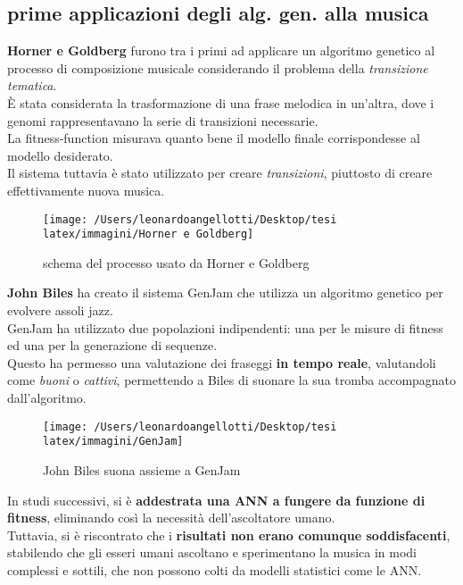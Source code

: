 \documentclass[a4paper,12pt]{report}
\begin{document}
\subsection{prime applicazioni degli alg. gen. alla musica}

\textbf{Horner e Goldberg} furono tra i primi ad applicare un algoritmo genetico al processo di composizione musicale considerando il problema della \textit{transizione tematica}. \\
È stata considerata la trasformazione di una frase melodica in un'altra, dove i genomi rappresentavano la serie di transizioni necessarie.  \\
La fitness-function misurava quanto bene il modello finale corrispondesse al modello desiderato. \\
Il sistema tuttavia è stato utilizzato per creare \textit{transizioni}, piuttosto di creare effettivamente nuova musica. 

\begin{figure}[H]
    \centering
    \texttt{[image: /Users/leonardoangellotti/Desktop/tesi latex/immagini/Horner e Goldberg]} 
    \caption{schema del processo usato da Horner e Goldberg}
    \label{fig:immagine17}
\end{figure}

\textbf{John Biles} ha creato il sistema GenJam che utilizza un algoritmo genetico per evolvere assoli jazz. \\
GenJam ha utilizzato due popolazioni indipendenti: una per le misure di fitness ed una per la generazione di sequenze. \\
Questo ha permesso una valutazione dei fraseggi \textbf{in tempo reale}, valutandoli come \textit{buoni} o \textit{cattivi}, permettendo a Biles di suonare la sua tromba accompagnato dall'algoritmo. 

\begin{figure}[H]
    \centering
    \texttt{[image: /Users/leonardoangellotti/Desktop/tesi latex/immagini/GenJam]} 
    \caption{John Biles suona assieme a GenJam}
    \label{fig:immagine7}
\end{figure}

In studi successivi, si è \textbf{addestrata una ANN a fungere da funzione di fitness}, eliminando così la necessità dell'ascoltatore umano. \\
Tuttavia, si è riscontrato che i \textbf{risultati non erano comunque soddisfacenti}, stabilendo che gli esseri umani ascoltano e sperimentano la musica in modi complessi e sottili, che non possono colti da modelli statistici come le ANN. \\
\end{document}
